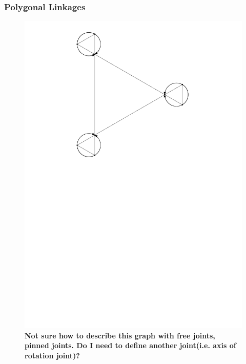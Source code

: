\subsubsection{Polygonal Linkages}
\begin{figure}[!ht]
\begin{center}
\includegraphics{graphics/PolygonalLinkageWithConfigurationSpace.pdf}
\end{center} 
\caption{\textbf{Not sure how to describe this graph with free joints, pinned joints.  Do I need to define another joint(i.e. axis of rotation joint)?}}
\end{figure} 